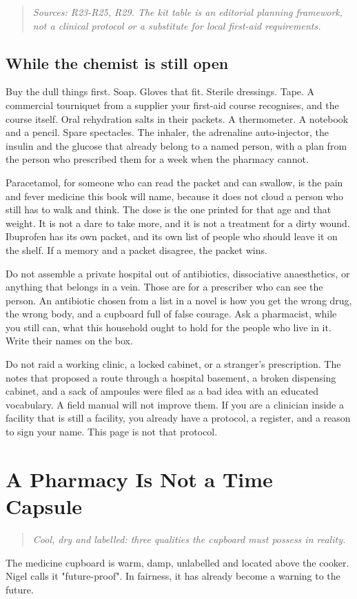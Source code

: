 \documentclass[10pt,openright]{book}
\begin{document}
\begin{quote}\emph{Sources: R23-R25, R29. The kit table is an editorial planning framework, not a clinical protocol or a substitute for local first-aid requirements.}\end{quote}
\section*{While the chemist is still open}
Buy the dull things first. Soap. Gloves that fit. Sterile dressings. Tape. A commercial tourniquet from a supplier your first-aid course recognises, and the course itself. Oral rehydration salts in their packets. A thermometer. A notebook and a pencil. Spare spectacles. The inhaler, the adrenaline auto-injector, the insulin and the glucose that already belong to a named person, with a plan from the person who prescribed them for a week when the pharmacy cannot.

Paracetamol, for someone who can read the packet and can swallow, is the pain and fever medicine this book will name, because it does not cloud a person who still has to walk and think. The dose is the one printed for that age and that weight. It is not a dare to take more, and it is not a treatment for a dirty wound. Ibuprofen has its own packet, and its own list of people who should leave it on the shelf. If a memory and a packet disagree, the packet wins.

Do not assemble a private hospital out of antibiotics, dissociative anaesthetics, or anything that belongs in a vein. Those are for a prescriber who can see the person. An antibiotic chosen from a list in a novel is how you get the wrong drug, the wrong body, and a cupboard full of false courage. Ask a pharmacist, while you still can, what this household ought to hold for the people who live in it. Write their names on the box.

Do not raid a working clinic, a locked cabinet, or a stranger's prescription. The notes that proposed a route through a hospital basement, a broken dispensing cabinet, and a sack of ampoules were filed as a bad idea with an educated vocabulary. A field manual will not improve them. If you are a clinician inside a facility that is still a facility, you already have a protocol, a register, and a reason to sign your name. This page is not that protocol.

\chapter{A Pharmacy Is Not a Time Capsule}
\begin{quote}\emph{Cool, dry and labelled: three qualities the cupboard must possess in reality.}\end{quote}
The medicine cupboard is warm, damp, unlabelled and located above the cooker. Nigel calls it "future-proof". In fairness, it has already become a warning to the future.
\end{document}
